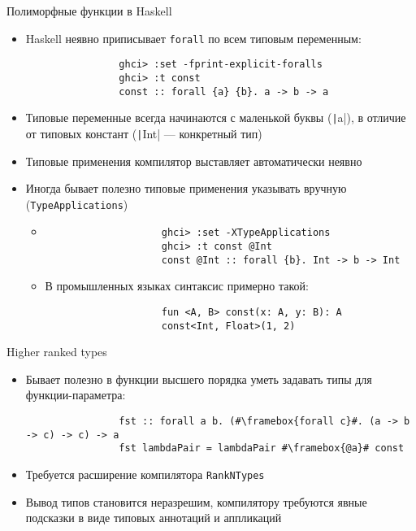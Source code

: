     \begin{frame}[fragile]{Полиморфные функции в Haskell \advancedslide}
        \begin{itemize}
            \item Haskell неявно приписывает \texttt{forall} по всем типовым переменным:
            \begin{verbatim}
                ghci> :set -fprint-explicit-foralls
                ghci> :t const
                const :: forall {a} {b}. a -> b -> a
            \end{verbatim}
            \item Типовые переменные всегда начинаются с маленькой буквы (\texttt|a|), в отличие от типовых констант (\texttt|Int| --- конкретный тип)
            \item Типовые применения компилятор выставляет автоматически неявно
            \item Иногда бывает полезно типовые применения указывать вручную (\texttt{TypeApplications})
            \begin{itemize}
                \item
                \begin{verbatim}
                    ghci> :set -XTypeApplications
                    ghci> :t const @Int
                    const @Int :: forall {b}. Int -> b -> Int
                \end{verbatim}
                \item В промышленных языках синтаксис примерно такой:
                \begin{verbatim}
                    fun <A, B> const(x: A, y: B): A
                    const<Int, Float>(1, 2)
                \end{verbatim}
            \end{itemize}
        \end{itemize}
    \end{frame}

    \begin{frame}[fragile]{Higher ranked types \advancedslide}
        \begin{itemize}
            \item Бывает полезно в функции высшего порядка уметь задавать типы для функции-параметра:
            \begin{verbatim}
                fst :: forall a b. (#\framebox{forall c}#. (a -> b -> c) -> c) -> a
                fst lambdaPair = lambdaPair #\framebox{@a}# const
            \end{verbatim}
            \item Требуется расширение компилятора \texttt{RankNTypes}
            \item Вывод типов становится неразрешим, компилятору требуются явные подсказки в виде типовых аннотаций и аппликаций
        \end{itemize}
    \end{frame}

